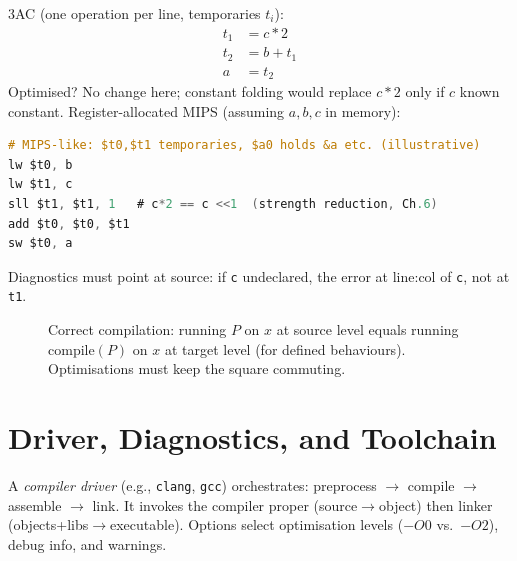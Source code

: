 3AC (one operation per line, temporaries $t_i$):
\begin{align*}
t_1 &= c * 2\\
t_2 &= b + t_1\\
a &= t_2
\end{align*}
Optimised? No change here; constant folding would replace $c*2$ only if $c$ known constant. Register-allocated MIPS (assuming $a,b,c$ in memory):
\begin{lstlisting}[language=C]
# MIPS-like: $t0,$t1 temporaries, $a0 holds &a etc. (illustrative)
lw $t0, b
lw $t1, c
sll $t1, $t1, 1   # c*2 == c <<1  (strength reduction, Ch.6)
add $t0, $t0, $t1
sw $t0, a
\end{lstlisting}
Diagnostics must point at source: if \texttt{c} undeclared, the error at line:col of \texttt{c}, not at \texttt{t1}.

\begin{figure}[h]
\centering
{}
\caption{Correct compilation: running $P$ on $x$ at source level equals running $\text{compile}(P)$ on $x$ at target level (for defined behaviours). Optimisations must keep the square commuting.}
\label{fig:correctness}
\end{figure}

\section{Driver, Diagnostics, and Toolchain}
\label{sec:driver}
A \emph{compiler driver} (e.g., \texttt{clang}, \texttt{gcc}) orchestrates: preprocess $\to$ compile $\to$ assemble $\to$ link. It invokes the compiler proper (source$\to$object) then linker (objects+libs$\to$executable). Options select optimisation levels ($-O0$ vs.\ $-O2$), debug info, and warnings.

